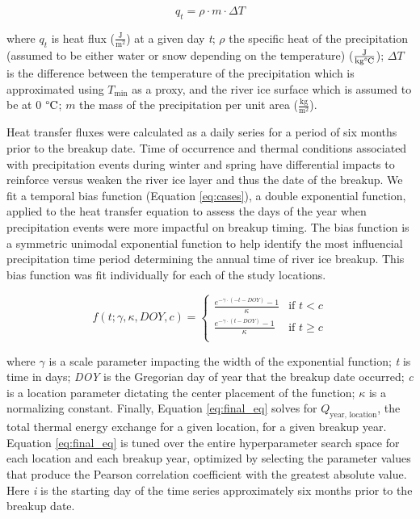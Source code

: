 \documentclass[12pts,draft]{AR_analysis_}
\begin{document}
\begin{equation}
q_{t} = \rho \cdot m \cdot \Delta T 
	\label{eq:heat_transport}
\end{equation}

\noindent where $q_{t}$ is heat flux ($\mathrm{\frac{J}{m^2}}$) at a 
given day \emph{t}; 
$\rho$ the specific heat 
of the precipitation (assumed to be either water or 
snow depending on the temperature)
($\mathrm{\frac{J}{kg \degree C}}$); $\Delta T$ is the difference between 
the temperature of the precipitation which is approximated 
using $T_{\text{min}}$ as a proxy, and the river ice surface which is
assumed to be at 0 $\mathrm{\degree C}$; $m$ 
the mass of the precipitation per unit area ($\mathrm{\frac{kg}{m^{2}}}$). 

Heat transfer fluxes were calculated as a daily series for a period of six
months prior to the breakup date. Time of occurrence and thermal
conditions associated with precipitation events during winter and spring
have differential impacts to reinforce versus weaken the river ice layer and
thus the date of the breakup.  
We fit a temporal bias function (Equation \ref{eq:cases}), a double
exponential function, applied to the heat transfer equation to assess 
the days of the year when precipitation events were more 
impactful on breakup timing. The bias function is a symmetric unimodal
exponential function to help identify the most influencial precipitation
time period determining the annual time of river ice breakup. This bias
function was fit individually for each of the study locations. 

\begin{equation}
	\label{eq:cases}
	f(t; \gamma, \kappa, DOY, c) =
	\begin{cases}
    	\frac{e^{-\gamma \cdot (-t - DOY)} - 1}{\kappa} & \text{if }
        	t < c \\
    	\frac{e^{-\gamma \cdot (t - DOY)} - 1}{\kappa} & \text{if }
        	t \geq c \\
	\end{cases}
\end{equation}

\noindent where $\gamma$ is a scale parameter impacting the width of
the exponential function; \emph{t} is time in days; 
\emph{DOY} is the Gregorian day of year
that the breakup date occurred; 
\emph{c} is a location parameter dictating the
center placement of the function; $\kappa$ is a normalizing constant.
Finally, Equation \ref{eq:final_eq} solves for $Q_{\text{year, location}}$,
the total thermal 
energy exchange for a given location, for a given breakup year.
Equation \ref{eq:final_eq} is tuned over the entire 
hyperparameter search space for each
location and each breakup year, optimized by selecting the 
parameter values that produce 
the Pearson correlation coefficient with the greatest absolute value. 
Here \emph{i} is the starting day of the time series approximately 
six months prior to the breakup date. 
\end{document}
